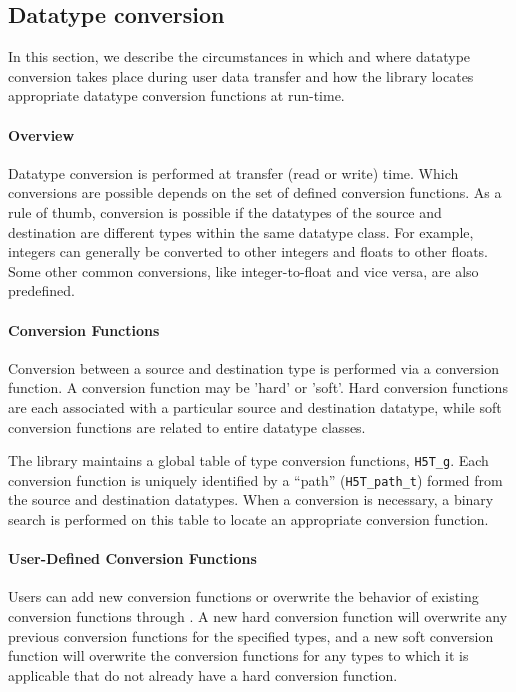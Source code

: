 \subsection{Datatype conversion}\label{sec:dtype-conv}

In this section, we describe the circumstances in which and where datatype conversion takes place during user data transfer and how the library locates appropriate datatype conversion functions at run-time.

\paragraph{Overview} Datatype conversion is performed at transfer (read or write) time. Which conversions are possible depends on the set of defined conversion functions. As a rule of thumb, conversion is possible if the datatypes of the source and destination are different types within the same datatype class. For example, integers can generally be converted to other integers and floats to other floats. Some other common conversions, like integer-to-float and vice versa, are also predefined.

\paragraph{Conversion Functions} Conversion between a source and destination type is performed via a conversion function. A conversion function may be 'hard' or 'soft'. Hard conversion functions are each associated with a particular source and destination datatype, while soft conversion functions are related to entire datatype classes.

The library maintains a global table of type conversion functions, \texttt{H5T\_g}. Each conversion function is uniquely identified by a ``path'' (\texttt{H5T\_path\_t}) formed from the source and destination datatypes. When a conversion is necessary, a binary search is performed on this table to locate an appropriate conversion function.

\paragraph{User-Defined Conversion Functions} Users can add new conversion functions or overwrite the behavior of existing conversion functions through . A new hard conversion function will overwrite any previous conversion functions for the specified types, and a new soft conversion function will overwrite the conversion functions for any types to which it is applicable that do not already have a hard conversion function.

